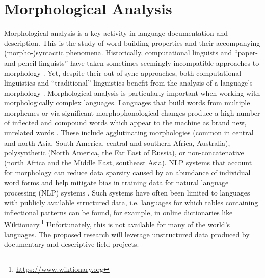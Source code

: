 \section{Morphological Analysis}

Morphological analysis is a key activity in language documentation and description. This is the study of word-building properties and their accompanying (morpho-)syntactic phenomena. Historically, computational linguists and ``paper-and-pencil linguists'' have taken sometimes seemingly incompatible approaches to morphology \citep{sproat_1992,karttunen_2005}. Yet, despite their out-of-sync approaches, both computational linguistics and ``traditional'' linguistics benefit from the analysis of a language's morphology \citep{cotterell_labeled_2015}. Morphological analysis is particularly important when working with morphologically complex languages.  Languages that build words from multiple morphemes or via significant morphophonological changes produce a high number of inflected and compound words which appear to the machine as brand new, unrelated words \citep{dreyer_discovering_2011,goldsmith_computational_2017,hammarstrom_unsupervised_2011,kann_neural_2016,ruokolainen_supervised_2013}. These include agglutinating morphologies (common in central and north Asia, South America, central and southern Africa, Australia), polysynthetic (North America, the Far East of Russia), or non-concatenative (north Africa and the Middle East, southeast Asia). NLP systems that account for morphology can reduce data sparsity caused by an abundance of individual word forms \citep{mccarthy-etal-2019-sigmorphon,vylomova2020sigmorphon} and help mitigate bias in training data for natural language processing (NLP) systems \citep{zmigrod-etal-2019-counterfactual}. Such systems have often been limited to languages with publicly available structured data, i.e. languages for which tables containing inflectional patterns can be found, for example, in online dictionaries like Wiktionary.\footnote{\url{https://www.wiktionary.org}} Unfortunately, this is not available for many of the world's languages. The proposed research will leverage unstructured data produced by documentary and descriptive field projects.
%

